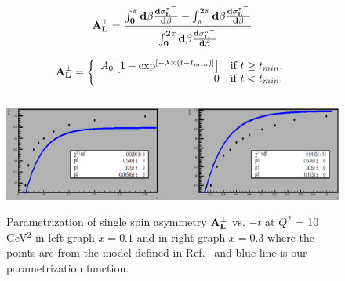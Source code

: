 \begin{equation}
  \bf{A_{L}^{\perp}} = \frac{\int^{\pi}_{0}d\beta\frac{d\sigma_{L}^{\pi^{-}}}{d\beta} - \int^{2\pi}_{\pi}d\beta\frac{d\sigma_{L}^{\pi^{-}}}{d\beta} } 
       {\int^{2\pi}_{0}d\beta\frac{d\sigma_{L}^{\pi^{-}}}{d\beta}}         
     \label{equation:ssa}
\end{equation}

\begin{equation}
        \bf{A_{L}^{\perp}} = \left\{
        \begin{array}{rl}
        A_{0} \left[ 1 - \exp^{ [ -\lambda \times ( t - t_{min} ) ] } \right] & \text{if } t \ge t_{min}, \\
        0 &  \text{if } t < t_{min}.
        \end{array} \right.
     \label{equation:asy-fit}
\end{equation}


\begin{figure}[!hbt]
    \centering
    \includegraphics[width=6.0in,height=1.5in]{./figures/asym_3.pdf}
    \caption{ Parametrization of single spin asymmetry $\bf{A_{L}^{\perp}}$ vs. $-t$ at $Q^2$ = 10 GeV$^2$ in 
    left graph $x = 0.1$ and in right  graph $x = 0.3$ where the points are from the model defined in Ref.~\cite{frankfurt} 
    and blue line is our parametrization function.}
    \label{fig:asym-1}
\end{figure}